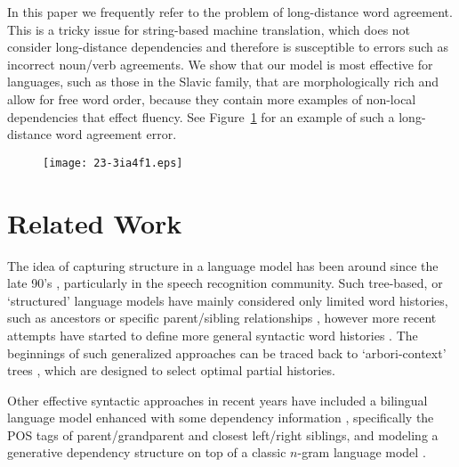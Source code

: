 \documentclass[english]{jnlp_1.4}
\begin{document}
In this paper we frequently refer to the problem of long-distance word agreement.
This is a tricky issue for string-based machine translation, which does not
consider long-distance dependencies and therefore is susceptible to errors such as
incorrect noun/verb agreements. We show that our model is most effective for
languages, such as those in the Slavic family, that are morphologically rich
and allow for free word order, because they contain more examples of non-local
dependencies that effect fluency. See Figure~\ref{Figure:Agreement}
for an example of such a long-distance word agreement error.

\begin{figure}[b]
\begin{center}
\texttt{[image: 23-3ia4f1.eps]}
\end{center}
\label{Figure:Agreement}
\end{figure}


\section{Related Work}

The idea of capturing structure in a language model has been around since the
late 90's \cite{Chelba97}, particularly in the speech recognition community.
Such tree-based, or `structured' language models have mainly
considered only limited word histories, such as ancestors \cite{Gubbins13}
or specific parent/sibling relationships \cite{Shen08}, however more
recent attempts have started to define more general syntactic word histories \cite{Sidorov12}.
The beginnings of such generalized approaches can be traced back to
`arbori-context' trees \cite{Mori01}, which are designed to select optimal
partial histories.

Other effective syntactic approaches in recent years have included a bilingual
language model \cite{Marino06,Niehues11}
enhanced with some dependency information \cite{Garmash14}, specifically the POS tags of
parent/grandparent and closest left/right siblings, and
modeling a generative dependency structure on top of a classic $n$-gram
language model \cite{Ding14}.
\end{document}
